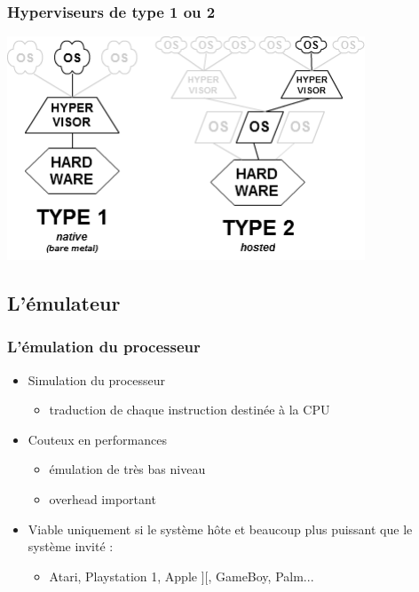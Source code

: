 \begin{frame}
\frametitle{Hyperviseurs de type 1 ou 2}
\includegraphics[width=0.8\textwidth]{../illustration/Hyperviseur.png}
\end{frame}


\subsection{L'émulateur}

\begin{frame}
\frametitle{L’émulation du processeur}
\begin{itemize}
\item Simulation du processeur
\begin{itemize}
\item traduction de chaque instruction destinée à la CPU
\end{itemize}
\item Couteux en performances
\begin{itemize}
  \item émulation de très bas niveau
  \item overhead important
\end{itemize}
\item Viable uniquement si le système hôte et beaucoup plus puissant que le système invité :
\begin{itemize}
\item Atari, Playstation 1, Apple ][, GameBoy, Palm...
\end{itemize}
\end{itemize}
\end{frame}

